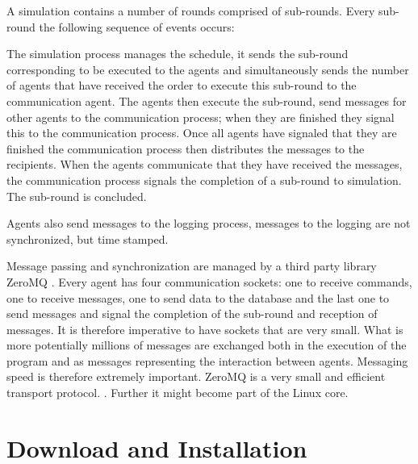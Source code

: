 \documentclass[letterpaper,10pt,english]{sphinxmanual}
\begin{document}
A simulation contains a number of rounds comprised of sub-rounds.
Every sub-round the following sequence of events occurs:

The simulation process manages the schedule, it sends the sub-round corresponding
to be executed to the agents and simultaneously sends the number of
agents that have received the order to execute this sub-round to the
communication agent. The agents then execute the sub-round, send
messages for other agents to the communication process; when
they are finished they signal this to the communication process. Once
all agents have signaled that they are finished the
communication process then distributes the messages to the
recipients. When the agents communicate that they have received
the messages, the communication process signals the completion
of a sub-round to simulation. The sub-round is concluded.

Agents also send messages to the logging process, messages to
the logging are not synchronized, but time stamped.

Message passing and synchronization are managed by a third
party library ZeroMQ \cite{hintjens2013zeromq}.
Every agent has four communication
sockets: one to receive commands, one to receive messages,
one to send data to the database and the last one to send
messages and signal the completion of the sub-round and reception
of messages. It is therefore imperative to have sockets that are
very small. What is more potentially millions of messages are
exchanged both in the execution of the program and as messages
representing the interaction between agents. Messaging speed
is therefore extremely important. ZeroMQ is a very small and
efficient transport protocol. \cite{Piel}. Further
it might become part of the Linux core.


\chapter{Download and Installation}
\label{installation:download-and-installation}\label{installation::doc}
\end{document}
